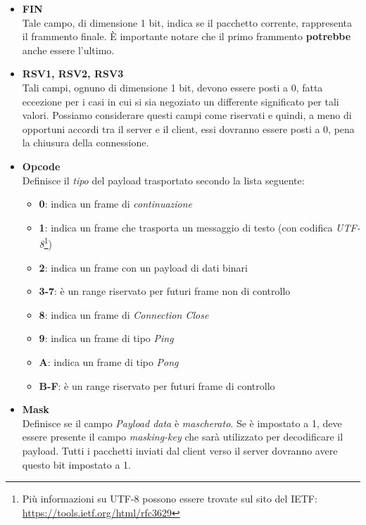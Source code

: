 \documentclass[
  oneside,
  11pt, a4paper,
  footinclude=true,
  headinclude=true,
  cleardoublepage=empty
]{scrbook}
\begin{document}
\begin{itemize}
  \item \textbf{FIN}\\
  Tale campo, di dimensione 1 bit, indica se il pacchetto corrente, rappresenta il frammento finale. È importante notare che il primo frammento \textbf{potrebbe} anche essere l'ultimo.
  \item \textbf{RSV1, RSV2, RSV3}\\
  Tali campi, ognuno di dimensione 1 bit, devono essere posti a 0, fatta eccezione per i casi in cui si sia negoziato un differente significato per tali valori.
  Possiamo considerare questi campi come riservati e quindi, a meno di opportuni accordi tra il server e il client, essi dovranno essere posti a 0, pena la chiusura della connessione.
  
  \item \textbf{Opcode}\\
  Definisce il \textit{tipo} del payload trasportato secondo la lista seguente:
  \begin{itemize}
      \item \textbf{0}: indica un frame di \textit{continuazione}
      \item \textbf{1}: indica un frame che trasporta un messaggio di testo (con codifica \textit{UTF-8}\footnote{Più informazioni su UTF-8 possono essere trovate sul sito del IETF: \href{https://tools.ietf.org/html/rfc3629}{https://tools.ietf.org/html/rfc3629}})
      \item \textbf{2}: indica un frame con un payload di dati binari
      \item \textbf{3-7}: è un range riservato per futuri frame non di controllo
      \item \textbf{8}: indica un frame di \textit{Connection Close} 
      \item \textbf{9}: indica un frame di tipo \textit{Ping}
      \item \textbf{A}: indica un frame di tipo \textit{Pong}
      \item \textbf{B-F}: è un range riservato per futuri frame di controllo
  \end{itemize}
  \item \textbf{Mask}\\
  Definisce se il campo \textit{Payload data} è \textit{mascherato}.
  Se è impostato a 1, deve essere presente il campo \textit{masking-key} che sarà utilizzato per decodificare il payload.
  Tutti i pacchetti inviati dal client verso il server dovranno avere questo bit impostato a 1.

\end{itemize}
\end{document}
